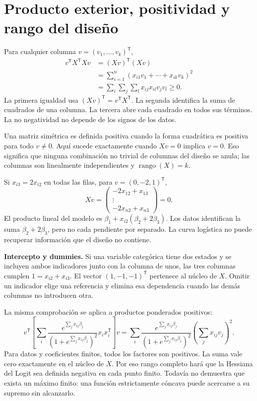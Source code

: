 \documentclass[11pt,a4paper]{article}
\newcommand{\T}{^{\mathsf T}}
\DeclareMathOperator{\rank}{rango}
\begin{document}
\clearpage
\section{Producto exterior, positividad y rango del diseño}\label{logit10}
Para cualquier columna $v=(v_1,\ldots,v_k)\T$,
\[
\begin{aligned}
v\T X\T Xv
&=(Xv)\T(Xv)\\
&=\sum_{i=1}^n(x_{i1}v_1+\cdots+x_{ik}v_k)^2\\
&=\sum_i\sum_j\sum_l x_{ij}x_{il}v_jv_l\ge0.
\end{aligned}
\]
La primera igualdad usa $(Xv)\T=v\T X\T$.
La segunda identifica la suma de cuadrados de una columna.
La tercera abre cada cuadrado en todos sus términos.
La no negatividad no depende de los signos de los datos.

Una matriz simétrica es definida positiva cuando la forma cuadrática
es positiva para todo $v\ne0$.
Aquí sucede exactamente cuando $Xv=0$ implica $v=0$.
Eso significa que ninguna combinación no trivial de columnas del diseño
se anula; las columnas son linealmente independientes y $\rank(X)=k$.

\begin{ejemplo}
Si $x_{i3}=2x_{i2}$ en todas las filas, para $v=(0,-2,1)\T$,
\[
Xv=\begin{pmatrix}
-2x_{12}+x_{13}\\\vdots\\-2x_{n2}+x_{n3}
\end{pmatrix}=0.
\]
El producto lineal del modelo es
$\beta_1+x_{i2}(\beta_2+2\beta_3)$.
Los datos identifican la suma $\beta_2+2\beta_3$,
pero no cada pendiente por separado.
La curva logística no puede recuperar información que el diseño no contiene.
\end{ejemplo}
\textbf{Intercepto y dummies.}
Si una variable categórica tiene dos estados y se incluyen ambos
indicadores junto con la columna de unos, las tres columnas cumplen
$1=x_{i2}+x_{i3}$.
El vector $(1,-1,-1)\T$ pertenece al núcleo de $X$.
Omitir un indicador elige una referencia y elimina esa dependencia
cuando las demás columnas no introducen otra.

La misma comprobación se aplica a productos ponderados positivos:
\[
v\T\left[\sum_i
\frac{e^{\sum_jx_{ij}\beta_j}}{(1+e^{\sum_jx_{ij}\beta_j})^2}
x_ix_i\T\right]v
=\sum_i
\frac{e^{\sum_jx_{ij}\beta_j}}{(1+e^{\sum_jx_{ij}\beta_j})^2}
\left(\sum_jx_{ij}v_j\right)^2.
\]
Para datos y coeficientes finitos, todos los factores son positivos.
La suma vale cero exactamente en el núcleo de $X$.
Por eso rango completo hará que la Hessiana del Logit sea
definida negativa en cada punto finito.
Todavía no demuestra que exista un máximo finito: una función estrictamente
cóncava puede acercarse a su supremo sin alcanzarlo.
\end{document}
